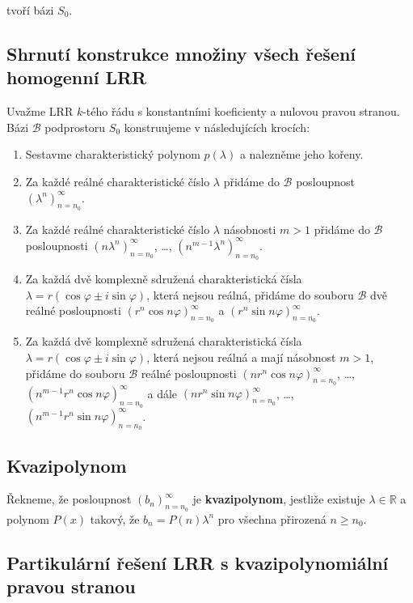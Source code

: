 \noindent tvoří bázi $S_0$.

\subsection*{Shrnutí konstrukce množiny všech řešení homogenní LRR}

Uvažme LRR $k$-tého řádu s konstantními koeficienty a nulovou pravou stranou.
Bázi $\mathcal{B}$ podprostoru $S_0$ konstruujeme v následujících krocích:

\begin{enumerate}
    \item Sestavme charakteristický polynom $p(\lambda)$ a nalezněme jeho kořeny.
    \item Za každé reálné charakteristické číslo $\lambda$ přidáme do $\mathcal{B}$
          posloupnost $(\lambda^n)_{n=n_0}^\infty$.
    \item Za každé reálné charakteristické číslo $\lambda$ násobnosti $m > 1$ přidáme do
          $\mathcal{B}$ posloupnosti $(n \lambda^n)_{n=n_0}^\infty$, \ldots,
          $(n^{m-1}\lambda^n)_{n=n_0}^\infty$.
    \item Za každá dvě komplexně sdružená charakteristická čísla $\lambda = r(\cos
              \varphi \pm i \sin \varphi)$, která nejsou reálná, přidáme do souboru
          $\mathcal{B}$ dvě reálné posloupnosti $(r^n \cos n\varphi)_{n=n_0}^\infty$ a
          $(r^n \sin n\varphi)_{n=n_0}^\infty$.
    \item Za každá dvě komplexně sdružená charakteristická čísla $\lambda = r(\cos
              \varphi \pm i \sin \varphi)$, která nejsou reálná a mají násobnost $m > 1$,
          přidáme do souboru $\mathcal{B}$ reálné posloupnosti $(n r^n \cos
              n\varphi)_{n=n_0}^\infty$, \ldots, $(n^{m-1} r^n \cos n\varphi)_{n=n_0}^\infty$
          a dále $(n r^n \sin n\varphi)_{n=n_0}^\infty$, \ldots, $(n^{m-1} r^n \sin
              n\varphi)_{n=n_0}^\infty$.
\end{enumerate}

\subsection*{Kvazipolynom}

Řekneme, že posloupnost $(b_n)_{n=n_0}^\infty$ je \textbf{kvazipolynom}, jestliže existuje $\lambda\in\mathbb{R}$ a polynom $P(x)$ takový, že $b_n = P(n) \lambda^n$ pro všechna přirozená $n \geq n_0$.

\subsection*{Partikulární řešení LRR s kvazipolynomiální pravou stranou}

